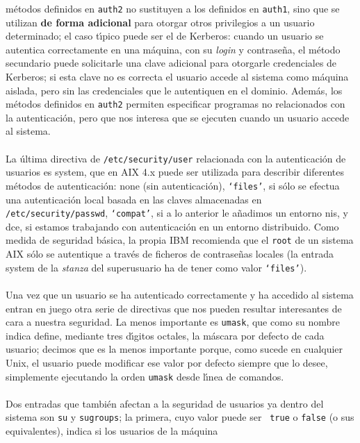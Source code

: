 m\'etodos definidos en {\tt auth2} no sustituyen a los definidos en {\tt auth1},
sino que se utilizan {\bf de forma adicional} para otorgar otros privilegios a 
un usuario determinado; el caso t\'{\i}pico puede ser el de Kerberos: cuando un
usuario se autentica correctamente en una m\'aquina, con su {\it login} y 
contrase\~na, el m\'etodo secundario puede solicitarle una clave adicional para 
otorgarle credenciales de Kerberos; si esta clave no es correcta el usuario 
accede al sistema como m\'aquina aislada, pero sin las credenciales que le
autentiquen en el dominio. Adem\'as, los m\'etodos definidos en {\tt auth2}
permiten especificar programas no relacionados con la autenticaci\'on, pero que 
nos interesa que se ejecuten cuando un usuario accede al sistema.\\
\\La \'ultima directiva de {\tt /etc/security/user} relacionada con la 
autenticaci\'on de usuarios es {\sc system}, que en AIX 4.x puede ser utilizada
para describir diferentes m\'etodos de autenticaci\'on: {\sc none} (sin 
autenticaci\'on), {\tt `files'}, si s\'olo
se efectua una autenticaci\'on local basada en las claves almacenadas en {\tt
/etc/security/passwd}, {\tt `compat'}, si a lo anterior le a\~nadimos un entorno
{\sc nis}, y {\sc dce}, si estamos trabajando con autenticaci\'on en un entorno
distribuido. Como medida de seguridad b\'asica, la propia IBM recomienda que el 
{\tt root} de un sistema AIX s\'olo se autentique a trav\'es de ficheros de 
contrase\~nas locales (la entrada {\sc system} de la {\it stanza} del 
superusuario ha de tener como valor {\tt `files'}).\\
\\Una vez que un usuario se ha autenticado correctamente y ha accedido al 
sistema entran en juego otra serie de directivas que nos pueden resultar 
interesantes de cara a nuestra seguridad. La menos importante es {\tt umask},
que como su nombre indica define, mediante tres d\'{\i}gitos octales, la 
m\'ascara por defecto de cada usuario; decimos que es la menos importante 
porque, como sucede en cualquier Unix, el usuario puede modificar ese valor por
defecto siempre que lo desee, simplemente ejecutando la orden {\tt umask} desde
l\'{\i}nea de comandos.\\
\\Dos entradas que tambi\'en afectan a la seguridad de usuarios ya dentro del
sistema son {\tt su} y {\tt sugroups}; la primera, cuyo valor puede ser {\tt
true} o {\tt false} (o sus equivalentes), indica si los usuarios de la m\'aquina
